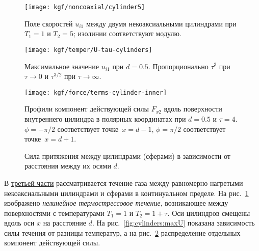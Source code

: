 
\begin{figure}
    \centering
    \texttt{[image: kgf/noncoaxial/cylinder5]}
    \caption{Поле скоростей \(u_{i1}\) между двумя некоаксиальными цилиндрами при \(T_1=1\) и \(T_2=5\);
        изолинии соответствуют модулю.}
    \label{fig:cylinders:velocity}
\end{figure}

\begin{figure}
    \centering
    \begin{minipage}{.48\textwidth}
        \texttt{[image: kgf/temper/U-tau-cylinders]}
        \caption{Максимальное значение \(u_{i1}\) при \(d=0.5\).
            Пропорционально \(\tau^3\) при \(\tau\to0\) и \(\tau^{3/2}\) при \(\tau\to\infty\).}
        \label{fig:cylinders:maxU}
    \end{minipage}
    \hfill
    \begin{minipage}{.48\textwidth}
        \texttt{[image: kgf/force/terms-cylinder-inner]}
        \caption{Профили компонент действующей силы \(F_{x2}\) вдоль поверхности внутреннего цилиндра
            в полярных координатах при \(d=0.5\) и \(\tau=4\).
            \(\phi = -\pi/2\) соответствует точке~\(x=d-1\), \(\phi = \pi/2\) соответствует точке~\(x=d+1\).}
        \label{fig:cylinders:terms_inner}
    \end{minipage}
\end{figure}

\begin{figure}
    \centering
    \caption{Сила притяжения между цилиндрами (сферами) в зависимости от расстояния между их осями \(d\).}
    \label{fig:cylinders:force}
\end{figure}

В \underline{третьей части} рассматривается течение газа между равномерно нагретыми
некоаксиальными цилиндрами и сферами в континуальном пределе.
На рис.~\ref{fig:cylinders:velocity} изображено \emph{нелинейное термострессовое течение},
возникающее между поверхностями с температурами \(T_1 = 1\) и \(T_2 = 1+\tau\).
Оси цилиндров смещены вдоль оси \(x\) на расстояние \(d\).
На рис.~\ref{fig:cylinders:maxU} показана зависимость силы течения от разницы температур,
а на рис.~\ref{fig:cylinders:terms_inner} распределение отдельных компонент действующей силы.

